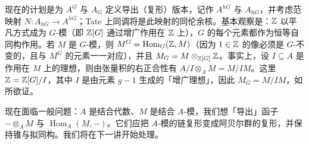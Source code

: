 现在的计划是为 $A^G$ 与 $A_G$ 定义导出（复形）版本，记作 $A^{hG}$ 与 $A_{hG}$，并考虑范映射 $N\colon A_{hG}\to A^{hG}$；Tate 上同调将是此映射的同伦余核。基本观察是：$\mathbb{Z}$ 以平凡方式成为 $G$-模（即 $\mathbb{Z}[G]$ 通过增广作用在 $\mathbb{Z}$ 上），$G$ 的每个元素都作为恒等自同构作用。若 $M$ 是 $G$-模，则 $M^G=\operatorname{Hom}_G(\mathbb{Z},M)$（因为 $1\in\mathbb{Z}$ 的像必须是 $G$-不变的，且与 $M^G$ 的元素一一对应），并且 $M_G=M\otimes_{\mathbb{Z}[G]}\mathbb{Z}$。事实上，设 $I\subseteq A$ 是作用在 $M$ 上的理想，则由张量积的右正合性有 $A/I\otimes_AM=M/IM$。这里 $\mathbb{Z}=\mathbb{Z}[G]/I$，其中 $I$ 是由元素 $g-1$ 生成的「增广理想」，因此 $M_G=M/IM$，如所欲证。

现在面临一般问题：$A$ 是结合代数、$M$ 是结合 $A$-模，我们想「导出」函子 $-\otimes_AM$ 与 $\operatorname{Hom}_A(M,-)$。它们应把 $A$-模的链复形变成阿贝尔群的复形，并保持锥与拟同构。我们将在下一讲开始处理。
